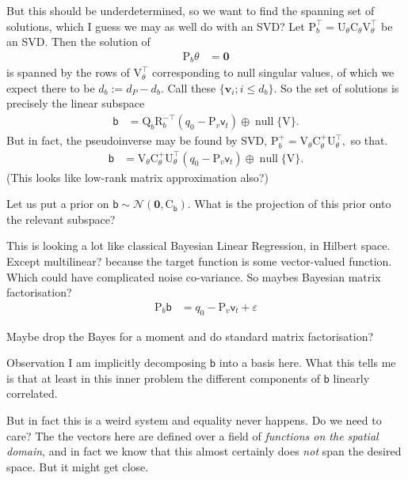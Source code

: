\documentclass{article}
\newcommand{\vv}[1]{\boldsymbol{#1}}
\newcommand{\mm}[1]{\mathrm{#1}}
\newcommand{\rv}[1]{\mathsf{#1}}
\newcommand{\dist}[1]{\mathcal{#1}}
\newcommand{\lat}{\rv{b}}   %
\newcommand{\latst}{b}      %
\begin{document}
But this should be underdetermined, so we want to find the spanning set of solutions, which I guess we may as well do with an SVD?
Let \(\mm{P}_{\latst}^\top=\mm{U}_\theta\mm{C}_\theta\mm{V}_\theta^{\top}\) be an SVD. 
Then the solution of 
\begin{align}
    \mm{P}_{\latst}\theta &= \vv{0}
\end{align}
is spanned by the rows of \(\mm{V}_\theta^{\top}\) corresponding to null singular values, of which we expect there to be \(d_b:=d_P-d_{\latst}\). Call these \(\{\vv{v}_i;i\leq d_b\}\).
So the set of solutions is precisely the linear subspace
\begin{align}
    \lat &= \mm{Q}_{\latst}\mm{R}_{\latst}^{-\top}(q_0 - \mm{P}_{v}\rv{v}_{t}) \oplus \operatorname{null}\{\mm{V}\}.
\end{align}
But in fact, the pseudoinverse may be found by SVD, \(\mm{P}_{\latst}^{+}=\mm{V}_\theta\mm{C}_\theta^{+}\mm{U}_\theta^{\top},\) so that.
\begin{align}
    \lat &=\mm{V}_\theta\mm{C}_\theta^{+}\mm{U}_\theta^{\top}(q_0 - \mm{P}_{v}\rv{v}_{t}) \oplus \operatorname{null}\{\mm{V}\}.
\end{align}
(This looks like low-rank matrix approximation also?)

Let us put a prior on \(\lat\sim\dist{N}(\vv{0},\mm{C}_{\lat})\).
What is the projection of this prior onto the relevant subspace?

This is looking a lot like classical Bayesian Linear Regression, in Hilbert space.
Except multilinear? because the target function is some vector-valued function.
Which could have complicated noise co-variance. So maybes Bayesian matrix factorisation?
\begin{align}
    \mm{P}_{\latst}\lat &= q_0 - \mm{P}_{v}\rv{v}_{t} + \varepsilon
\end{align}

Maybe drop the Bayes for a moment and do standard matrix factorisation?

Observation I am implicitly decomposing \(\lat\) into a basis here.
What this tells me is that at least in this inner problem the different components of \(\lat\) linearly correlated.

But in fact this is a weird system and equality never happens. Do we need to care?
The the vectors here are defined over a field of \emph{functions on the spatial domain}, and in fact we know that this almost certainly does \emph{not} span the desired space. But it might get close. 
\end{document}
